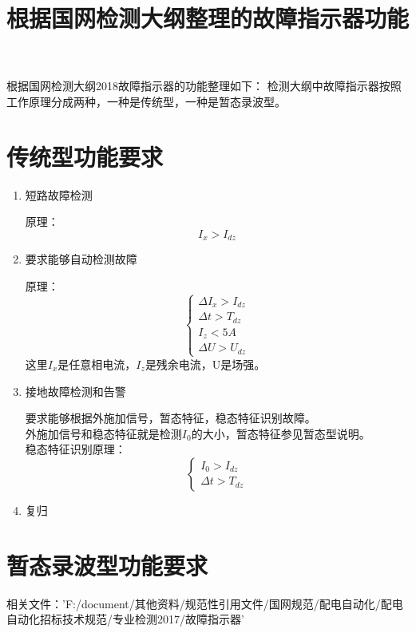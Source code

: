 \documentclass{article}
\begin{document}
\begin{CJK}{UTF8}{gbsn}
\title{根据国网检测大纲整理的故障指示器功能}
\maketitle
根据国网检测大纲2018故障指示器的功能整理如下：
检测大纲中故障指示器按照工作原理分成两种，一种是传统型，一种是暂态录波型。

\section{传统型功能要求}
\begin{enumerate}
\item	短路故障检测
\par
	原理：
	\begin{equation}
		I_x>I_{dz}
	\end{equation}
\item	要求能够自动检测故障
\par
	原理：
	\begin{equation}	
		\left\{ \begin{array}{c}
			\Delta I_x>I_{dz} \\
			\Delta t>T_{dz} \\
			I_z<5A\\ 
			\Delta U>U_{dz}
		\end{array}
		\right .
	\end{equation}
	这里$I_x$是任意相电流，$I_z$是残余电流，U是场强。
\item	接地故障检测和告警
	\par
	要求能够根据外施加信号，暂态特征，稳态特征识别故障。\\
	外施加信号和稳态特征就是检测$I_0$的大小，暂态特征参见暂态型说明。\\
	稳态特征识别原理：
	\begin{equation}
		\left\{
			\begin{array}{ccc}
				I_0>I_{dz}\\
				\Delta t>T_{dz}
			\end{array}
			\right .
	\end{equation}
\item	复归
	\par




	
	
\end{enumerate}
\section{暂态录波型功能要求}


相关文件：'F:/document/其他资料/规范性引用文件/国网规范/配电自动化/配电自动化招标技术规范/专业检测2017/故障指示器'
\end{CJK}
\end{document}
